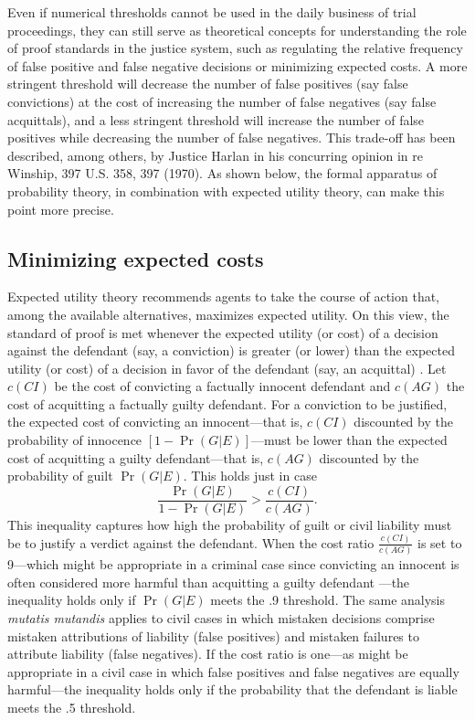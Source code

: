 \documentclass{article}
\begin{document}
Even if numerical thresholds cannot be used in the daily business of trial proceedings, they
can still serve as theoretical concepts for understanding the role of proof standards in the justice system, such as regulating the relative frequency of false positive and false negative decisions or minimizing expected costs.
A more stringent threshold will decrease the number of false positives (say false convictions) at the cost of increasing the number of false negatives (say false acquittals), and a less stringent threshold will increase the number of false positives while decreasing the number of false negatives.
This trade-off has been described, among others, by Justice Harlan in his concurring opinion in re Winship, 397 U.S. 358, 397 (1970).  
As shown below, the formal apparatus of probability theory, in combination with expected utility theory, can make this point more precise. 



\subsection{Minimizing expected costs}


  Expected utility theory recommends agents to take the course of action that, among the available alternatives,  maximizes expected utility. On this view, 
the standard of proof is met whenever the expected utility (or cost) of a decision against the defendant (say, a conviction) is greater (or lower) than the expected utility (or cost) of a decision in favor of the defendant (say, an acquittal) \citep{kaplan1968decision, Dekay1996, hamer2004}.
Let $c(CI)$ be the cost of convicting a factually innocent defendant and $c(AG)$ the cost of acquitting a factually guilty defendant. For a conviction to be justified, the expected cost of convicting an innocent---that is, $c(CI)$  discounted by the probability of innocence $[1-\Pr(G|E)]$---must be lower than the expected cost of acquitting a guilty defendant---that is, $c(AG)$ discounted by the probability of guilt $\Pr(G|E)$. This holds just in case 
\[ \frac{\Pr(G|E)}{1- \Pr(G|E)} > \frac{c(CI)}{c(AG)}.\]
This inequality captures 
how high the probability 
of guilt or civil liability must be to justify a verdict against the defendant. 
When the cost ratio $\frac{c(CI)}{c(AG)}$ is set to 9---which might be appropriate in a criminal 
case since convicting an innocent is often considered more harmful than acquitting a guilty defendant \citep[however, see ][]{laudan2016law} ---the inequality holds only if $\Pr(G | E)$ meets the .9 threshold.
The same analysis \textit{mutatis mutandis} applies to civil cases in which mistaken decisions comprise mistaken attributions of liability (false positives) and mistaken failures to attribute liability (false negatives). If the cost ratio is one---as might be appropriate in a civil case in which false positives and false negatives are equally harmful---the inequality holds only if the probability that the defendant is liable meets the .5 threshold. %
\end{document}

